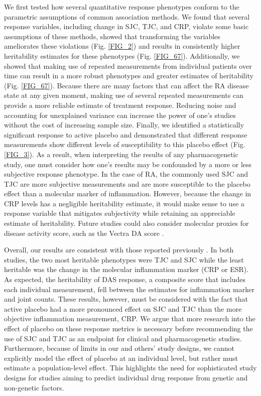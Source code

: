 We first tested how several quantitative response phenotypes conform to the parametric assumptions of common association methods. We found that several response variables, including change in SJC, TJC, and CRP, violate some basic assumptions of these methods, showed that transforming the variables ameliorates these violations (Fig. \ref{FIG_2}) and results in consistently higher heritability estimates for these phenotypes (Fig. \ref{FIG_67}). Additionally, we showed that making use of repeated measurements from individual patients over time can result in a more robust phenotypes and greater estimates of heritability (Fig. \ref{FIG_67}). Because there are many factors that can affect the RA disease state at any given moment, making use of several repeated measurements can provide a more reliable estimate of treatment response. Reducing noise and accounting for unexplained variance can increase the power of one’s studies without the cost of increasing sample size. Finally, we identified a statistically significant response to active placebo and demonstrated that different response measurements show different levels of susceptibility to this placebo effect (Fig. \ref{FIG_3}). As a result, when interpreting the results of any pharmacogenetic study, one must consider how one’s results may be confounded by a more or less subjective response phenotype. In the case of RA, the commonly used SJC and TJC are more subjective measurements and are more susceptible to the placebo effect than a molecular marker of inflammation. However, because the change in CRP levels has a negligible heritability estimate, it would make sense to use a response variable that mitigates subjectivity while retaining an appreciable estimate of heritability. Future studies could also consider molecular proxies for disease activity score, such as the Vectra DA score \cite{centola_development_2013,curtis_validation_2012}.

Overall, our results are consistent with those reported previously \cite{umicevic_mirkov_estimation_2014}. In both studies, the two most heritable phenotypes were TJC and SJC while the least heritable was the change in the molecular inflammation marker (CRP or ESR). As expected, the heritability of DAS response, a composite score that includes each individual measurement, fell between the estimates for inflammation marker and joint counts. These results, however, must be considered with the fact that active placebo had a more pronounced effect on SJC and TJC than the more objective inflammation measurement, CRP. We argue that more research into the effect of placebo on these response metrics is necessary before recommending the use of SJC and TJC as an endpoint for clinical and pharmacogenetic studies. Furthermore, because of limits in our and others’ study designs, we cannot explicitly model the effect of placebo at an individual level, but rather must estimate a population-level effect. This highlights the need for sophisticated study designs for studies aiming to predict individual drug response from genetic and non-genetic factors.

